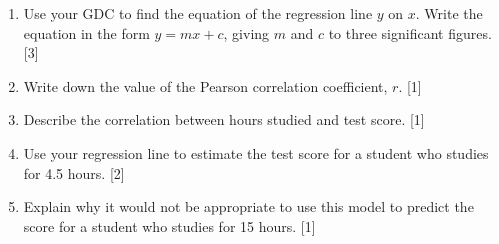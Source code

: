 \documentclass[12pt, twoside]{article}
\begin{document}
\begin{enumerate}[itemsep=0.15cm]
\begin{enumerate}[itemsep=0.15cm]
  \item Use your GDC to find the equation of the regression line $y$ on $x$.
        Write the equation in the form $y = mx + c$, giving $m$ and $c$
        to three significant figures. \hfill [3]
  \item Write down the value of the Pearson correlation coefficient, $r$. \hfill [1]
  \item Describe the correlation between hours studied and test score. \hfill [1]
  \item Use your regression line to estimate the test score for a student
        who studies for 4.5 hours. \hfill [2]
  \item Explain why it would not be appropriate to use this model to predict the
        score for a student who studies for 15 hours. \hfill [1]
\end{enumerate}


\end{enumerate}
\end{document}

